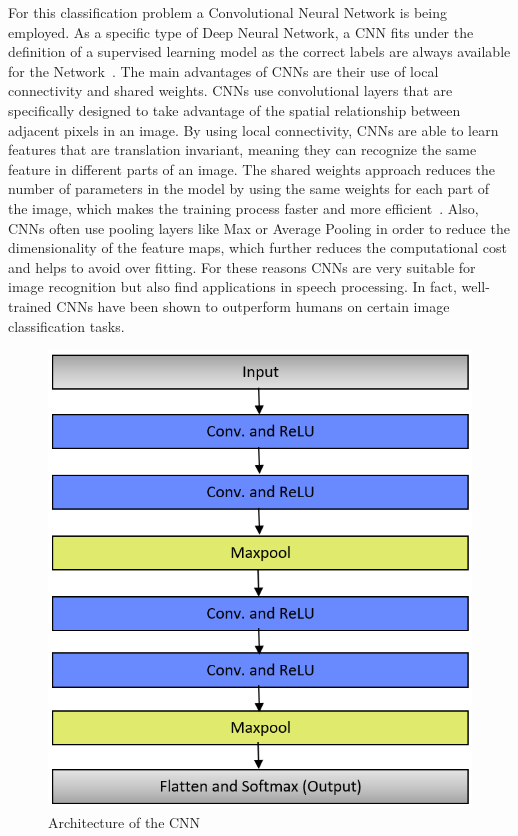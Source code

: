 \documentclass[@CLASSOPTIONS@]{tumarticle}
\begin{document}
For this classification problem a Convolutional Neural Network is being employed.
As a specific type of Deep Neural Network, a CNN fits under the definition of a supervised learning model as the correct
labels are always available for the Network~\cite[p.~9]{reviewDL}.
The main advantages of CNNs are their use of local connectivity and shared weights.
CNNs use convolutional layers that are specifically designed to take advantage of the spatial relationship between
adjacent pixels in an image.
By using local connectivity, CNNs are able to learn features that are translation invariant, meaning they can
recognize the same feature in different parts of an image.
The shared weights approach reduces the number of parameters in the model by using the same weights for each part of the
image, which makes the training process faster and more efficient~\cite[p.~13-14]{reviewDL}.
Also, CNNs often use pooling layers like Max or Average Pooling in order to reduce the dimensionality of the feature maps,
which further reduces the computational cost and helps to avoid over fitting.
For these reasons CNNs are very suitable for image recognition but also find applications in speech
processing.
In fact, well-trained CNNs have been shown to outperform humans on certain image classification tasks.

\begin{figure}
    \begin{minipage}{0.48\textwidth}
     \centering
     \includegraphics[width=.9\linewidth]{figures/CNN_Arch_5}
     \caption{Architecture of the CNN}\label{Fig:CNN_A}
   \end{minipage}
\end{figure}
\end{document}
